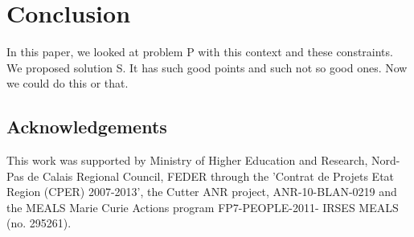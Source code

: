 \documentclass{article}
\begin{document}

\section{Conclusion}
\label{sec:conclusion}

In this paper, we looked at problem P with this context and these
constraints. We proposed solution S. It has such good points and such not so
good ones. Now we could do this or that.

\subsection*{Acknowledgements} This work was supported by Ministry of Higher Education and Research, Nord-Pas de Calais Regional Council, FEDER through the 'Contrat de
Projets Etat Region (CPER) 2007-2013',  the Cutter ANR project, ANR-10-BLAN-0219 and the MEALS Marie Curie Actions program FP7-PEOPLE-2011-
IRSES MEALS (no. 295261). 

% 
% 

% 



\end{document}

